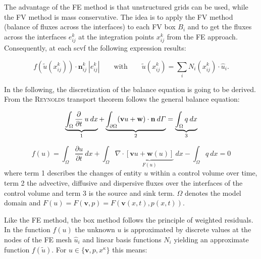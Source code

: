 The advantage of the FE method is that unstructured grids can be used, while the
FV method is mass conservative. The idea is to apply the FV method (balance of
fluxes across the interfaces) to each FV box $B_i$  and to get the fluxes across
the interfaces $e^k_{ij}$ at the integration points $x^k_{ij}$ from the FE approach.
Consequently, at each scvf the following expression results:

\begin{equation}
 	f(\tilde u(x^k_{ij})) \cdot \mathbf n^k_{ij} \: |e^k_{ij}| \qquad \textrm{with}
 	\qquad \tilde u(x^k_{ij}) = \sum_i N_i(x^k_{ij}) \cdot \hat u_i .
\end{equation}

In the following, the discretization of the balance equation is going to be derived.
From the \textsc{Reynolds} transport theorem follows the general balance equation:

\begin{equation}
	\underbrace{\int_\Omega \frac{\partial}{\partial t} \: u \: dx}_{1}
	+ \underbrace{\int_{\partial\Omega} (\mathbf{v} u + \mathbf w) \cdot \textbf n \: d\varGamma}_{2} = \underbrace{\int_\Omega q \: dx}_{3}
\end{equation}

\begin{equation}
	f(u) = \int_\Omega \frac{\partial u}{\partial t} \: dx + \int_{\Omega} \nabla \cdot
	\underbrace{\left[  \mathbf{v} u + \mathbf w(u)\right] }_{F(u)}  \: dx - \int_\Omega q \: dx = 0
\end{equation}
where term 1 describes the changes of entity $u$ within a control volume over
time, term 2 the advective, diffusive and dispersive fluxes over the interfaces
of the control volume and term 3 is the source and sink term. $\Omega$ denotes the
model domain and $F(u) = F(\mathbf v, p) = F(\mathbf v(x,t), p(x,t))$.

Like the FE method, the box method follows the principle of weighted residuals.
In the function $f(u)$ the unknown $u$ is approximated by discrete values at the
nodes of the FE mesh $\hat u_i$ and linear basis functions $N_i$ yielding an
approximate function $f(\tilde u)$. For $u\in \lbrace \mathbf v, p, x^\kappa \rbrace$
this means:

